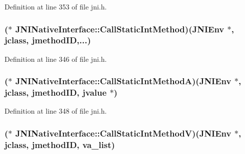 Definition at line 353 of file jni.\-h.

\hypertarget{struct_j_n_i_native_interface_a6bc342215f5a77197580ffadd82515a9}{
\subsubsection[{Call\-Static\-Int\-Method}]{($\ast$ J\-N\-I\-Native\-Interface\-::\-Call\-Static\-Int\-Method)({\bf J\-N\-I\-Env} $\ast$, {\bf jclass}, {\bf jmethod\-I\-D},...)}}\label{struct_j_n_i_native_interface_a6bc342215f5a77197580ffadd82515a9}


Definition at line 346 of file jni.\-h.

\hypertarget{struct_j_n_i_native_interface_a98d792a66d091d1a74def8d5e3bd0782}{
\subsubsection[{Call\-Static\-Int\-Method\-A}]{($\ast$ J\-N\-I\-Native\-Interface\-::\-Call\-Static\-Int\-Method\-A)({\bf J\-N\-I\-Env} $\ast$, {\bf jclass}, {\bf jmethod\-I\-D}, {\bf jvalue} $\ast$)}}\label{struct_j_n_i_native_interface_a98d792a66d091d1a74def8d5e3bd0782}


Definition at line 348 of file jni.\-h.

\hypertarget{struct_j_n_i_native_interface_acbf427c075c88abb57de6ac3cc5f8f67}{
\subsubsection[{Call\-Static\-Int\-Method\-V}]{($\ast$ J\-N\-I\-Native\-Interface\-::\-Call\-Static\-Int\-Method\-V)({\bf J\-N\-I\-Env} $\ast$, {\bf jclass}, {\bf jmethod\-I\-D}, va\-\_\-list)}}\label{struct_j_n_i_native_interface_acbf427c075c88abb57de6ac3cc5f8f67}


